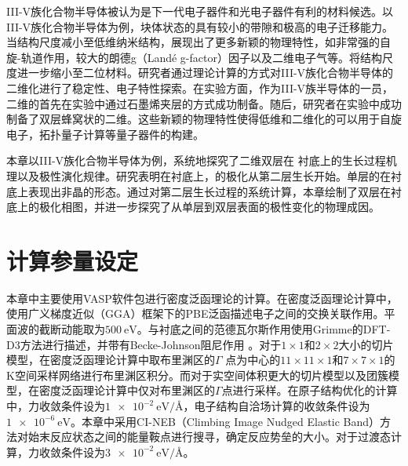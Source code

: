 III-V族化合物半导体被认为是下一代电子器件和光电子器件有利的材料候选。以III-V族化合物半导体为例，块体状态的具有较小的带隙和极高的电子迁移能力。当结构尺度减小至低维纳米结构，展现出了更多新颖的物理特性，如非常强的自旋-轨道作用，较大的朗德g（Landé g-factor）因子以及二维电子气等。将结构尺度进一步缩小至二位材料。研究者通过理论计算的方式对III-V族化合物半导体的二维化进行了稳定性、电子特性探索。在实验方面，作为III-V族半导体的一员，二维的首先在实验中通过石墨烯夹层的方式成功制备。随后，研究者在实验中成功制备了双层蜂窝状的二维。这些新颖的物理特性使得低维和二维化的可以用于自旋电子，拓扑量子计算等量子器件的构建。

本章以III-V族化合物半导体为例，系统地探究了二维双层在  衬底上的生长过程机理以及极性演化规律。研究表明在衬底上，的极化从第二层生长开始。单层的在衬底上表现出非晶的形态。通过对第二层生长过程的系统计算，本章绘制了双层在衬底上的极化相图，并进一步探究了从单层到双层表面的极性变化的物理成因。
\section{计算参量设定}
本章中主要使用VASP软件包进行密度泛函理论的计算。在密度泛函理论计算中，使用广义梯度近似（GGA）框架下的PBE泛函描述电子之间的交换关联作用。平面波的截断动能取为$\SI{500}{\electronvolt}$。与衬底之间的范德瓦尔斯作用使用Grimme的DFT-D3方法进行描述，并带有Becke-Johnson阻尼作用 。对于$1 \times 1$和$2 \times 2$大小的切片模型，在密度泛函理论计算中取布里渊区的$\Gamma$ 点为中心的$11 \times 11 \times 1$和$7 \times 7 \times 1$的K空间采样网络进行布里渊区积分。而对于实空间体积更大的切片模型以及团簇模型，在密度泛函理论计算中仅对布里渊区的$\Gamma$点进行采样。在原子结构优化的计算中，力收敛条件设为$\SI{1e-2}{\electronvolt \per \angstrom}$，电子结构自洽场计算的收敛条件设为$\SI{1e-6}{\electronvolt}$。本章中采用CI-NEB（Climbing Image Nudged Elastic Band）方法对始末反应状态之间的能量鞍点进行搜寻，确定反应势垒的大小。对于过渡态计算，力收敛条件设为$\SI{3e-2}{\electronvolt \per \angstrom}$。


